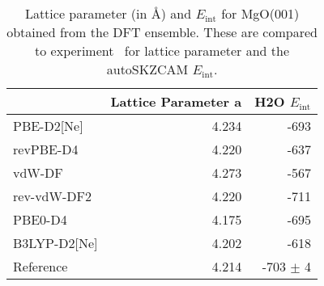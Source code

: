 \begin{table}
\caption{\label{tab:lattice_parametersmgo}Lattice parameter (in \AA{}) and  $E_\textrm{int}$ for MgO(001) obtained from the DFT ensemble. These are compared to experiment~\cite{singhSynthesisCharacterizationAlkalineEarthOxide2018} for lattice parameter and the autoSKZCAM $E_\textrm{int}$.}
\begin{tabular}{lrr}
\toprule
 & Lattice Parameter a & H2O $E_\textrm{int}$ \\ 
\midrule
PBE-D2[Ne] & 4.234 & -693 \\
revPBE-D4 & 4.220 & -637 \\
vdW-DF & 4.273 & -567 \\
rev-vdW-DF2 & 4.220 & -711 \\
PBE0-D4 & 4.175 & -695 \\
B3LYP-D2[Ne] & 4.202 & -618 \\
Reference & 4.214 & -703 $\pm$ 4 \\
\bottomrule
\end{tabular}
\end{table}